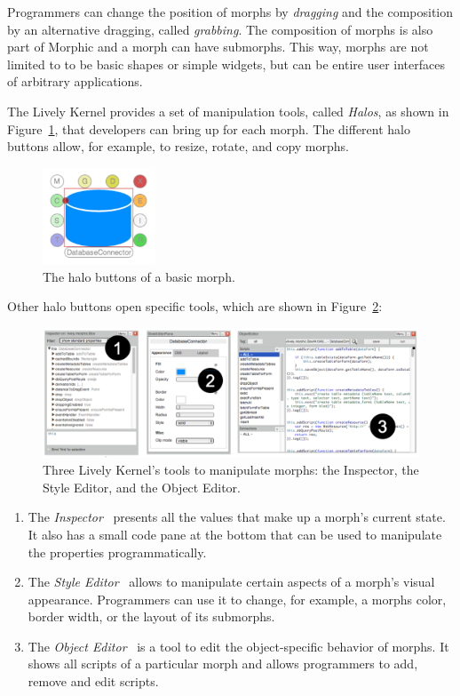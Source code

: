 Programmers can change the position of morphs by \emph{dragging} and the composition by an alternative dragging, called \emph{grabbing}.
The composition of morphs is also part of Morphic and a morph can have submorphs.
This way, morphs are not limited to to be basic shapes or simple widgets, but can be entire user interfaces of arbitrary applications.

The Lively Kernel provides a set of manipulation tools, called \emph{Halos}, as shown in Figure~\ref{fig:Halos}, that developers can bring up for each morph.
The different halo buttons allow, for example, to resize, rotate, and copy morphs.

\begin{figure}[h]
    \centering
    \includegraphics[width=0.3\textwidth]{figures/2_background/1_halos.pdf}
    \caption{The halo buttons of a basic morph.}
    \label{fig:Halos}
\end{figure}

Other halo buttons open specific tools, which are shown in Figure~\ref{fig:LivelyTools}:

\begin{figure}[h]
    \centering
    \includegraphics[width=\textwidth]{figures/2_background/2_LivelyTools.pdf}
    \caption{Three Lively Kernel's tools to manipulate morphs: the Inspector, the Style Editor, and the Object Editor.}
    \label{fig:LivelyTools}
\end{figure}

\begin{enumerate}
    \item The \emph{Inspector}~ presents all the values that make up a morph's current state. It also has a small code pane at the bottom that can be used to manipulate the properties programmatically.
    \item The \emph{Style Editor}~ allows to manipulate certain aspects of a morph's visual appearance. Programmers can use it to change, for example, a morphs color, border width, or the layout of its submorphs.
    \item The \emph{Object Editor}~ is a tool to edit the object-specific behavior of morphs. It shows all scripts of a particular morph and allows programmers to add, remove and edit scripts.
\end{enumerate}



